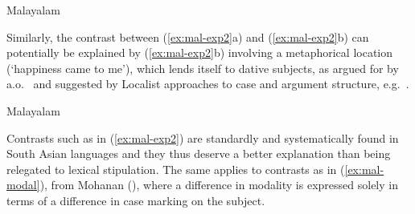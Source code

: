 \documentclass[output=paper,hidelinks]{langscibook}
\begin{document}
\begin{exe}
  \ex \label{ex:mal-exp1} Malayalam
  \begin{xlist}
  \end{xlist}
\end{exe}

Similarly, the contrast between (\ref{ex:mal-exp2}a) and (\ref{ex:mal-exp2}b)
can potentially be explained by  (\ref{ex:mal-exp2}b) involving a metaphorical
location (`happiness came to me'), which lends itself to dative subjects, as
argued for by a.o.~\citet{landau10} and suggested by Localist approaches to case
and argument structure, e.g.~\citet{gruber65,jackendoff1990semantic}. 

\begin{exe}
  \ex Malayalam \label{ex:mal-exp2}
  \begin{xlist}
  \end{xlist}
\end{exe}
Contrasts such as in (\ref{ex:mal-exp2}) are standardly and systematically found in South Asian
languages and they thus deserve a better explanation than being relegated to
lexical stipulation.  The same applies to contrasts as in (\ref{ex:mal-modal}),
from Mohanan (\citeyear[542]{mohanan1982}), where a difference in modality is
expressed solely in terms of a difference in case marking on the subject.
\end{document}
